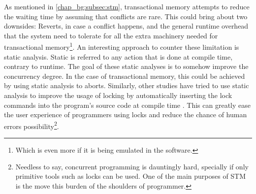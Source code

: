 As mentioned in \ref{chap_bg:subsec:stm}, transactional memory attempts to reduce the waiting time
by assuming that conflicts are rare. This could bring about two downsides: Reverts, in case a
conflict happens, and the general runtime overhead that the system need to tolerate for all the
extra machinery needed for transactional memory\footnote{Which is even more if it is being emulated
in the software.}. An interesting approach to counter these limitation is static analysis. Static is
referred to any action that is done at compile time, contrary to runtime. The goal of these static
analyses is to somehow improve the concurrency degree. In the case of transactional memory, this
could be achieved by using static analysis to aborts\cite{diasEfficientCorrectTransactional}.
Similarly, other studies have tried to use static analysis to improve the usage of locking by
automatically inserting the lock commands into the program's source code at compile time
\cite{cheremInferringLocksAtomic2007}. This can greatly ease the user experience of programmers
using locks and reduce the chance of human errors possibility\footnote{Needless to say, concurrent programming
is dauntingly hard, specially if only primitive tools such as locks can be used. One of the main
purposes of STM is the move this burden of the shoulders of programmer.}.
